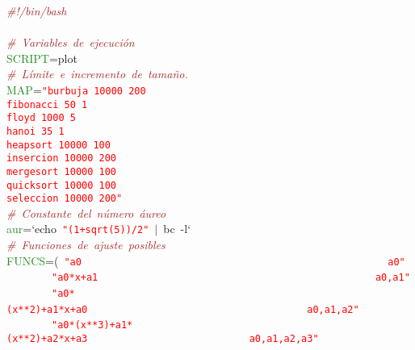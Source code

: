 \noindent
\mbox{}\textit{\textcolor{Brown}{\#!/bin/bash}} \\
\mbox{} \\
\mbox{}\textit{\textcolor{Brown}{\#\ Variables\ de\ ejecución}} \\
\mbox{}\textcolor{ForestGreen}{SCRIPT}\textcolor{BrickRed}{=}plot \\
\mbox{}\textit{\textcolor{Brown}{\#\ Límite\ e\ incremento\ de\ tamaño.}} \\
\mbox{}\textcolor{ForestGreen}{MAP}\textcolor{BrickRed}{=}\texttt{\textcolor{Red}{"{}burbuja\ 10000\ 200}} \\
\mbox{}\texttt{\textcolor{Red}{fibonacci\ 50\ 1}} \\
\mbox{}\texttt{\textcolor{Red}{floyd\ 1000\ 5}} \\
\mbox{}\texttt{\textcolor{Red}{hanoi\ 35\ 1}} \\
\mbox{}\texttt{\textcolor{Red}{heapsort\ 10000\ 100}} \\
\mbox{}\texttt{\textcolor{Red}{insercion\ 10000\ 200}} \\
\mbox{}\texttt{\textcolor{Red}{mergesort\ 10000\ 100}} \\
\mbox{}\texttt{\textcolor{Red}{quicksort\ 10000\ 100}} \\
\mbox{}\texttt{\textcolor{Red}{seleccion\ 10000\ 200"{}}} \\
\mbox{}\textit{\textcolor{Brown}{\#\ Constante\ del\ número\ áureo}} \\
\mbox{}\textcolor{ForestGreen}{aur}\textcolor{BrickRed}{=}`echo\ \texttt{\textcolor{Red}{"{}(1+sqrt(5))/2"{}}}\ \textcolor{BrickRed}{$|$}\ bc\ -l` \\
\mbox{}\textit{\textcolor{Brown}{\#\ Funciones\ de\ ajuste\ posibles}} \\
\mbox{}\textcolor{ForestGreen}{FUNCS}\textcolor{BrickRed}{=(}\ \texttt{\textcolor{Red}{"{}a0\ \ \ \ \ \ \ \ \ \ \ \ \ \ \ \ \ \ \ \ \ \ \ \ \ \ \ \ \ \ \ \ \ \ \ \ \ \ \ \ \ \ \ \ \ \ \ \ \ \ \ \ \ a0"{}}} \\
\mbox{}\ \ \ \ \ \ \ \ \texttt{\textcolor{Red}{"{}a0*x+a1\ \ \ \ \ \ \ \ \ \ \ \ \ \ \ \ \ \ \ \ \ \ \ \ \ \ \ \ \ \ \ \ \ \ \ \ \ \ \ \ \ \ \ \ \ \ \ \ a0,a1"{}}} \\
\mbox{}\ \ \ \ \ \ \ \ \texttt{\textcolor{Red}{"{}a0*(x**2)+a1*x+a0\ \ \ \ \ \ \ \ \ \ \ \ \ \ \ \ \ \ \ \ \ \ \ \ \ \ \ \ \ \ \ \ \ \ \ \ \ \ a0,a1,a2"{}}}\ \ \ \ \ \  \\
\mbox{}\ \ \ \ \ \ \ \ \texttt{\textcolor{Red}{"{}a0*(x**3)+a1*(x**2)+a2*x+a3\ \ \ \ \ \ \ \ \ \ \ \ \ \ \ \ \ \ \ \ \ \ \ \ \ \ \ \ a0,a1,a2,a3"{}}} \\
